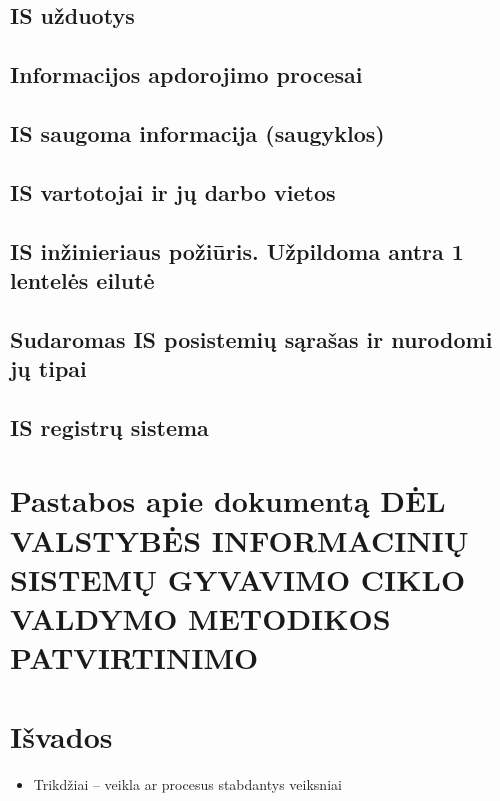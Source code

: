 \documentclass{VUMIFPSkursinis}
\begin{document}
\newpage
\subsection{IS užduotys}

\newpage
\subsection{Informacijos apdorojimo procesai}

\newpage
\subsection{IS saugoma informacija (saugyklos)}

\newpage
\subsection{IS vartotojai ir jų darbo vietos}

\newpage
\subsection{IS inžinieriaus požiūris. Užpildoma antra 1 lentelės eilutė}

\newpage
\subsection{Sudaromas IS posistemių sąrašas ir nurodomi jų tipai}

\newpage
\subsection{IS registrų sistema}

\newpage
\section{Pastabos apie dokumentą DĖL VALSTYBĖS INFORMACINIŲ SISTEMŲ GYVAVIMO CIKLO VALDYMO METODIKOS PATVIRTINIMO}

\newpage

\section{Išvados}

\newpage
{}
\begin{itemize}
	\item{Trikdžiai -- veikla ar procesus stabdantys veiksniai}
\end{itemize}
\end{document}
